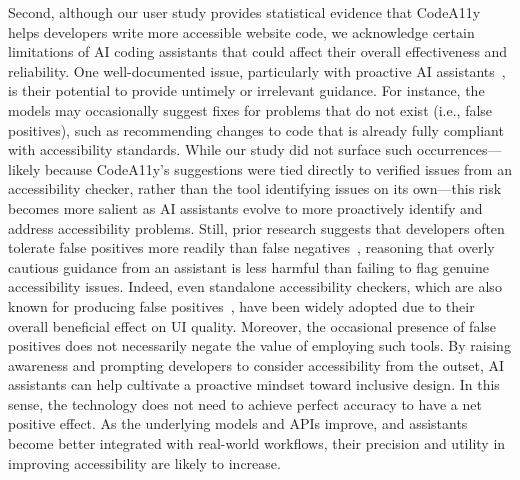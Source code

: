 \begin{highlight}
Second, although our user study provides statistical evidence that CodeA11y helps developers write more accessible website code, we acknowledge certain limitations of AI coding assistants that could affect their overall effectiveness and reliability. One well-documented issue, particularly with proactive AI assistants~\cite{chen2024need}, is their potential to provide untimely or irrelevant guidance. For instance, the models may occasionally suggest fixes for problems that do not exist (i.e., false positives), such as recommending changes to code that is already fully compliant with accessibility standards.
While our study did not surface such occurrences---likely because CodeA11y’s suggestions were tied directly to verified issues from an accessibility checker, rather than the tool identifying issues on its own---this risk becomes more salient as AI assistants evolve to more proactively identify and address accessibility problems. Still, prior research suggests that developers often tolerate false positives more readily than false negatives~\cite{kocielnik2019will}, reasoning that overly cautious guidance from an assistant is less harmful than failing to flag genuine accessibility issues. Indeed, even standalone accessibility checkers, which are also known for producing false positives~\cite{huq2023a11ydev}, have been widely adopted due to their overall beneficial effect on UI quality.
Moreover, the occasional presence of false positives does not necessarily negate the value of employing such tools. By raising awareness and prompting developers to consider accessibility from the outset, AI assistants can help cultivate a proactive mindset toward inclusive design. In this sense, the technology does not need to achieve perfect accuracy to have a net positive effect. As the underlying models and APIs improve, and assistants become better integrated with real-world workflows, their precision and utility in improving accessibility are likely to increase.


\end{highlight}
